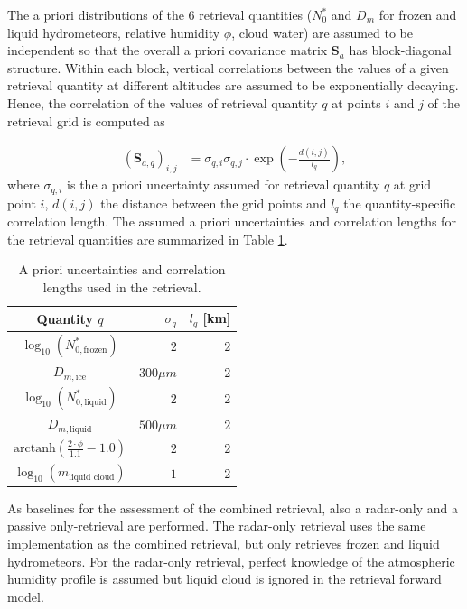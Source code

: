 \documentclass[journal abbreviation, manuscript]{copernicus}
\begin{document}
The a priori distributions of the 6 retrieval quantities ($N_0^*$ and $D_m$ for
frozen and liquid hydrometeors, relative humidity $\phi$, cloud water) are
assumed to be independent so that the overall a priori covariance matrix
$\mathbf{S}_a$ has block-diagonal structure. Within each block, vertical
correlations between the values of a given retrieval quantity at different
altitudes are assumed to be exponentially decaying. Hence, the correlation of
the values of retrieval quantity $q$ at points $i$ and $j$ of the retrieval grid
is computed as

\begin{align}
\left ( \mathbf{S}_{a,q} \right )_{i, j} &= \sigma_{q,i} \sigma_{q,j}
 \cdot \exp ( -\frac{d(i, j)}{l_q}),
\end{align}
where $\sigma_{q, i}$ is the a priori uncertainty assumed for retrieval
quantity $q$ at grid point $i$, $d(i, j)$ the distance between the grid
points and $l_q$ the quantity-specific correlation length. The assumed
a priori uncertainties and correlation lengths for the retrieval quantities
are summarized in Table \ref{tab:a_priori}.


\begin{table}[h!]
\caption{A priori uncertainties and correlation
 lengths used in the retrieval.}
 \centering
\label{tab:a_priori}
    \begin{tabular}{c|r|r}
     Quantity $q$ & $\sigma_q$ & $l_q$ [km]\\
    \hline
    $\log_{10}(N_{0, \text{frozen}}^*)$    & $2$                       & $2$ \\
    $D_{m, \text{ice}}$               & $300\unit{\mu m}$ & $2$ \\
    $\log_{10}(N_{0, \text{liquid}}^*)$    & $2                      $ & $2$ \\
    $D_{m, \text{liquid}}$            & $500\unit{\mu m}$ & $2$ \\
    $\text{arctanh}(\frac{2 \cdot \phi}{1.1} - 1.0)$ & $2$                       & $2$ \\
    $\log_{10}(m_\text{liquid cloud}) $ & $1$                       & $2$ \\
    \end{tabular}
\end{table}

As baselines for the assessment of the combined retrieval, also a radar-only and
a passive only-retrieval are performed. The radar-only retrieval uses the same
implementation as the combined retrieval, but only retrieves frozen and liquid
hydrometeors. For the radar-only retrieval, perfect knowledge of the atmospheric
humidity profile is assumed but liquid cloud is ignored in the retrieval forward
model.
\end{document}
